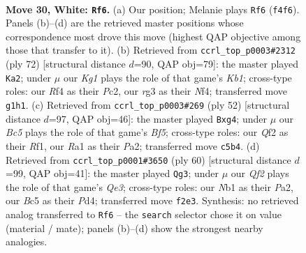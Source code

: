 \documentclass[11pt]{article}
\begin{document}
\clearpage

\begin{figure}[p]\centering
\begin{subfigure}{0.46\textwidth}\centering
\resizebox{\linewidth}{!}{%
\newchessgame
\chessboard[
  setfen={rnb1k3/8/6q1/p1Bp4/1p3R2/6r1/PPP2QP1/RN4K1 w - - 6 30},
  showmover=false,
  pgfstyle=straightmove, color=movearrow, markmove={f4-f6}
]}
\caption{}
\end{subfigure}\hfill
\begin{subfigure}{0.46\textwidth}\centering
\resizebox{\linewidth}{!}{%
\newchessgame
\chessboard[
  setfen={4k3/8/p2ppb1p/1p6/3rPNq1/PPQ2R2/2P5/1K6 w - - 3 37},
  showmover=false,
  pgfstyle=straightmove, color=movearrow, markmove={b1-a2}
]}
\caption{}
\end{subfigure}
\\[4pt]
\begin{subfigure}{0.46\textwidth}\centering
\resizebox{\linewidth}{!}{%
\newchessgame
\chessboard[
  setfen={4k2r/pp3p2/1npb4/5B2/3P1Np1/6P1/PPQ2KPq/5R2 w - - 0 27},
  showmover=false,
  pgfstyle=straightmove, color=movearrow, markmove={f5-g4}
]}
\caption{}
\end{subfigure}\hfill
\begin{subfigure}{0.46\textwidth}\centering
\resizebox{\linewidth}{!}{%
\newchessgame
\chessboard[
  setfen={1r4k1/3b2p1/4p2p/8/p2PBr1q/4Q2P/PPR2P2/4R1K1 w - - 1 31},
  showmover=false,
  pgfstyle=straightmove, color=movearrow, markmove={e3-g3}
]}
\caption{}
\end{subfigure}
\caption{\textbf{Move 30, White: \texttt{Rf6}.} (a) Our position; Melanie plays \texttt{Rf6} (\texttt{f4f6}). Panels (b)--(d) are the retrieved master positions whose correspondence most drove this move (highest QAP objective among those that transfer to it). (b) Retrieved from \texttt{ccrl\_top\_p0003\#2312} (ply 72) [structural distance $d$=90, QAP obj=79]: the master played \texttt{Ka2}; under $\mu$ our \emph{Kg1} plays the role of that game's \emph{Kb1}; cross-type roles: our \emph{R}f4 as their \emph{P}c2, our \emph{r}g3 as their \emph{N}f4; transferred move \texttt{g1h1}. (c) Retrieved from \texttt{ccrl\_top\_p0003\#269} (ply 52) [structural distance $d$=97, QAP obj=46]: the master played \texttt{Bxg4}; under $\mu$ our \emph{Bc5} plays the role of that game's \emph{Bf5}; cross-type roles: our \emph{Q}f2 as their \emph{R}f1, our \emph{R}a1 as their \emph{P}a2; transferred move \texttt{c5b4}. (d) Retrieved from \texttt{ccrl\_top\_p0001\#3650} (ply 60) [structural distance $d$=99, QAP obj=41]: the master played \texttt{Qg3}; under $\mu$ our \emph{Qf2} plays the role of that game's \emph{Qe3}; cross-type roles: our \emph{N}b1 as their \emph{P}a2, our \emph{B}c5 as their \emph{P}d4; transferred move \texttt{f2e3}. Synthesis: no retrieved analog transferred to \texttt{Rf6} -- the \texttt{search} selector chose it on value (material / mate); panels (b)--(d) show the strongest nearby analogies.}
\label{fig:thought-m58}
\end{figure}
\end{document}
